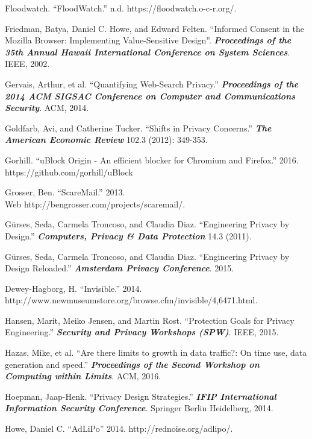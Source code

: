 \documentclass[conference]{IEEEtran}
\begin{document}
\begin{thebibliography}{99}
 Floodwatch. “FloodWatch.” n.d. https://floodwatch.o-c-r.org/.

 Friedman, Batya, Daniel C. Howe, and Edward Felten. “Informed Consent in the Mozilla Browser: Implementing Value-Sensitive Design”. \textbf{\textit{Proceedings of the 35th Annual Hawaii International Conference on System Sciences}}. IEEE, 2002.

 Gervais, Arthur, et al. “Quantifying Web-Search Privacy.” \textbf{\textit{Proceedings of the 2014 ACM SIGSAC Conference on Computer and Communications Security}}. ACM, 2014.

 Goldfarb, Avi, and Catherine Tucker. “Shifts in Privacy Concerns.” \textbf{\textit{The American Economic Review}} 102.3 (2012): 349-353.

 Gorhill. “uBlock Origin - An efficient blocker for Chromium and Firefox.” 2016. https://github.com/gorhill/uBlock

 Grosser, Ben. “ScareMail.” 2013.\\ Web http://bengrosser.com/projects/scaremail/.

 G\"urses, Seda, Carmela Troncoso, and Claudia Diaz. “Engineering Privacy by Design.” \textbf{\textit{Computers, Privacy \& Data Protection}} 14.3 (2011).

 G\"urses, Seda, Carmela Troncoso, and Claudia Diaz. “Engineering Privacy by Design Reloaded.” \textbf{\textit{Amsterdam Privacy Conference}}. 2015.

 Dewey-Hagborg, H. ``Invisible.'' 2014. \\ http://www.newmuseumstore.org/browse.cfm/invisible/4,6471.html.

 Hansen, Marit, Meiko Jensen, and Martin Rost. “Protection Goals for Privacy Engineering.” \textbf{\textit{Security and Privacy Workshops (SPW)}}. IEEE, 2015.

 Hazas, Mike, et al. “Are there limits to growth in data traffic?: On time use, data generation and speed.” \textbf{\textit{Proceedings of the Second Workshop on Computing within Limits}}. ACM, 2016.

 Hoepman, Jaap-Henk. “Privacy Design Strategies.” \textbf{\textit{IFIP International Information Security Conference}}. Springer Berlin Heidelberg, 2014.

 Howe, Daniel C. “AdLiPo” 2014. http://rednoise.org/adlipo/.


\end{thebibliography}
\end{document}
